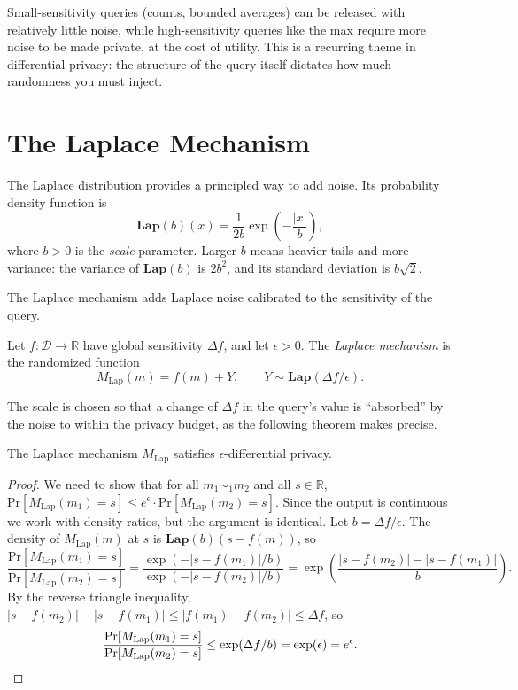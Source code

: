 \documentclass[11pt]{article}
\newcommand{\pr}{\mathrm{Pr}}
\newcommand{\lap}{\mathbf{Lap}}
\newcommand{\sens}{\Delta}
\begin{document}
Small-sensitivity queries (counts, bounded averages) can be released with
relatively little noise, while high-sensitivity queries like the max require
more noise to be made private, at the cost of utility.  This is a recurring
theme in differential privacy: the structure of the query itself dictates how
much randomness you must inject.

\section{The Laplace Mechanism}

The Laplace distribution provides a principled way to add noise.  Its
probability density function is
\[
  \lap(b)(x) = \frac{1}{2b}\exp\!\left(-\frac{|x|}{b}\right),
\]
where $b > 0$ is the \emph{scale} parameter.  Larger $b$ means heavier tails
and more variance: the variance of $\lap(b)$ is $2b^2$, and its standard
deviation is $b\sqrt 2$.

The Laplace mechanism adds Laplace noise calibrated to the sensitivity of the
query.

\begin{definition}
\label{def:laplace}
Let $f : \mathcal{D} \to \mathbb{R}$ have global sensitivity $\sens f$, and
let $\epsilon > 0$.  The \emph{Laplace mechanism} is the randomized
function
\[
  M_\mathrm{Lap}(m) = f(m) + Y, \qquad Y \sim \lap(\sens f / \epsilon).
\]
\end{definition}

The scale is chosen so that a change of $\sens f$ in the query's value is
``absorbed'' by the noise to within the privacy budget, as the following
theorem makes precise.

\begin{theorem}
\label{thm:laplace}
The Laplace mechanism $M_\mathrm{Lap}$ satisfies $\epsilon$-differential
privacy.
\end{theorem}

\begin{proof}
We need to show that for all $m_1 \sim_1 m_2$ and all $s \in \mathbb{R}$,
$\pr[M_\mathrm{Lap}(m_1) = s] \leq e^\epsilon \cdot \pr[M_\mathrm{Lap}(m_2) = s]$.
Since the output is continuous we work with density ratios, but the
argument is identical.  Let $b = \sens f / \epsilon$.  The density of
$M_\mathrm{Lap}(m)$ at $s$ is $\lap(b)(s - f(m))$, so
\[
  \frac{\pr[M_\mathrm{Lap}(m_1) = s]}{\pr[M_\mathrm{Lap}(m_2) = s]}
  = \frac{\exp(-|s - f(m_1)|/b)}{\exp(-|s - f(m_2)|/b)}
  = \exp\!\left(\frac{|s - f(m_2)| - |s - f(m_1)|}{b}\right).
\]
By the reverse triangle inequality,
$|s - f(m_2)| - |s - f(m_1)| \leq |f(m_1) - f(m_2)| \leq \sens f$, so
\[
  \frac{\pr[M_\mathrm{Lap}(m_1) = s]}{\pr[M_\mathrm{Lap}(m_2) = s]}
  \leq \exp(\sens f / b) = \exp(\epsilon) = e^\epsilon. \qedhere
\]
\end{proof}
\end{document}
